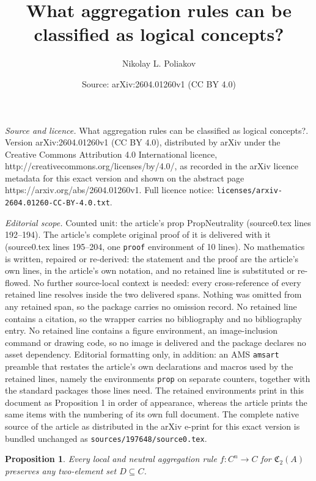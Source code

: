 \documentclass[10pt,a4paper]{amsart}
\title{What aggregation rules can be classified as logical concepts?}
\author{Nikolay L. Poliakov}
\date{Source: arXiv:2604.01260v1 (CC BY 4.0)}
\newtheorem{prop}{Proposition}
\begin{document}
\maketitle

\noindent\emph{Source and licence.} What aggregation rules can be classified as logical concepts?. Version arXiv:2604.01260v1 (CC BY 4.0), distributed by arXiv under the Creative Commons Attribution 4.0 International licence, http://creativecommons.org/licenses/by/4.0/, as recorded in the arXiv licence metadata for this exact version and shown on the abstract page https://arxiv.org/abs/2604.01260v1. Full licence notice: \texttt{licenses/arxiv-2604.01260-CC-BY-4.0.txt}.\par\smallskip

\noindent\textit{Editorial scope.} Counted unit: the article's prop PropNeutrality (source0.tex lines 192--194). The article's complete original proof of it is delivered with it (source0.tex lines 195--204, one \texttt{proof} environment of 10 lines). No mathematics is written, repaired or re-derived: the statement and the proof are the article's own lines, in the article's own notation, and no retained line is substituted or re-flowed.  No further source-local context is needed: every cross-reference of every retained line resolves inside the two delivered spans.  Nothing was omitted from any retained span, so the package carries no omission record.  No retained line contains a citation, so the wrapper carries no bibliography and no bibliography entry.  No retained line contains a figure environment, an image-inclusion command or drawing code, so no image is delivered and the package declares no asset dependency.  Editorial formatting only, in addition: an AMS \texttt{amsart} preamble that restates the article's own declarations and macros used by the retained lines, namely the environments \texttt{prop} on separate counters, together with the standard packages those lines need.  The retained environments print in this document as Proposition 1 in order of appearance, whereas the article prints the same items with the numbering of its own full document.  The complete native source of the article as distributed in the arXiv e-print for this exact version is bundled unchanged as \texttt{sources/197648/source0.tex}.
\begin{prop}\label{PropNeutrality}
	Every local and neutral aggregation rule $f:C^n\to C$ for $\mathfrak C_2(A)$ preserves any two-element set $D\subseteq C$.
\end{prop}
\end{document}
